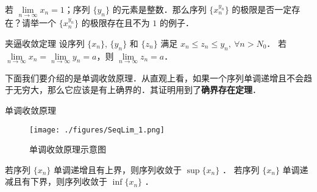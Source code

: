 \begin{exercise}{}
  若 $\lim\limits_{n\rightarrow \infty} x_n=1$；序列 $\{y_n\}$ 的元素是整数．那么序列 $\{x_n^{y_n}\}$  的极限是否一定存在？请举一个 $\{x_n^{y_n}\}$ 的极限存在且不为 $1$ 的例子．
\end{exercise}

\begin{theorem}{夹逼收敛定理}
  设序列 $\{x_n\}$, $\{y_n\}$ 和 $\{z_n\}$ 满足 $x_n\leq z_n\leq y_n,\ \forall n>N_0$．
若 $\lim\limits_{n\rightarrow \infty}x_n=\lim\limits_{n\rightarrow \infty}y_n=a$，则 $\lim\limits_{n\rightarrow \infty}z_n=a$．
\end{theorem}
下面我们要介绍的是单调收敛原理．从直观上看，如果一个序列单调递增且不会趋于无穷大，那么它应该是有上确界的．其证明用到了\textbf{确界存在定理}．

\begin{theorem}{单调收敛原理}
\begin{figure}[ht]
\centering
\texttt{[image: ./figures/SeqLim\_1.png]}
\caption{单调收敛原理示意图} \label{SeqLim_fig2}
\end{figure}

若序列 $\{x_n\}$ 单调递增且有上界，则序列收敛于 $\sup \{x_n\}$ ．
若序列 $\{x_n\}$ 单调递减且有下界，则序列收敛于 $\inf\{x_n\}$ ．
\end{theorem}
